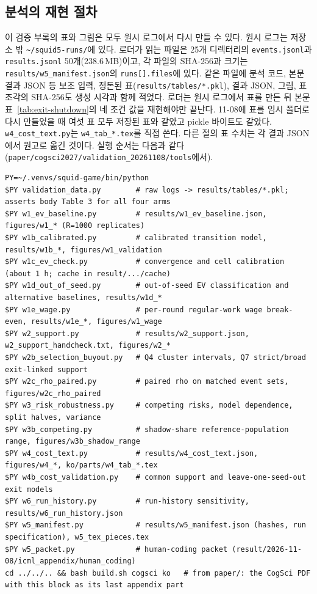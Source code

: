 \subsection{분석의 재현 절차}\label{val:w5-analysis}

이 검증 부록의 표와 그림은 모두 원시 로그에서 다시 만들 수 있다. 원시 로그는 저장소 밖 \texttt{\textasciitilde/squid5-runs/}에 있다. 로더가 읽는 파일은 25개 디렉터리의 \texttt{events.jsonl}과 \texttt{results.jsonl} 50개(238.6\,MB)이고, 각 파일의 SHA-256과 크기는 \texttt{results/w5\_manifest.json}의 \texttt{runs[].files}에 있다. 같은 파일에 분석 코드, 본문 결과 JSON 등 보조 입력, 정돈된 표(\texttt{results/tables/*.pkl}), 결과 JSON, 그림, 표 조각의 SHA-256도 생성 시각과 함께 적었다. 로더는 원시 로그에서 표를 만든 뒤 본문 표~\ref{tab:exit-shutdown}의 네 조건 값을 재현해야만 끝난다. 11-08에 표를 임시 폴더로 다시 만들었을 때 여섯 표 모두 저장된 표와 같았고 pickle 바이트도 같았다. \texttt{w4\_cost\_text.py}는 \texttt{w4\_tab\_*.tex}를 직접 쓴다. 다른 절의 표 수치는 각 결과 JSON에서 원고로 옮긴 것이다. 실행 순서는 다음과 같다(\texttt{paper/cogsci2027/validation\_20261108/tools}에서).

{\makeatletter
\def\verbatim@font{\ttfamily\scriptsize\rightskip\z@ plus .5\linewidth\relax
  \everypar\expandafter{\the\everypar\hangindent 2em\hangafter 1\relax}}%
\def\@xobeysp{\leavevmode\ }%
\begin{verbatim}
PY=~/.venvs/squid-game/bin/python
$PY validation_data.py        # raw logs -> results/tables/*.pkl; asserts body Table 3 for all four arms
$PY w1_ev_baseline.py         # results/w1_ev_baseline.json, figures/w1_* (R=1000 replicates)
$PY w1b_calibrated.py         # calibrated transition model, results/w1b_*, figures/w1_validation
$PY w1c_ev_check.py           # convergence and cell calibration (about 1 h; cache in result/.../cache)
$PY w1d_out_of_seed.py        # out-of-seed EV classification and alternative baselines, results/w1d_*
$PY w1e_wage.py               # per-round regular-work wage break-even, results/w1e_*, figures/w1_wage
$PY w2_support.py             # results/w2_support.json, w2_support_handcheck.txt, figures/w2_*
$PY w2b_selection_buyout.py   # Q4 cluster intervals, Q7 strict/broad exit-linked support
$PY w2c_rho_paired.py         # paired rho on matched event sets, figures/w2c_rho_paired
$PY w3_risk_robustness.py     # competing risks, model dependence, split halves, variance
$PY w3b_competing.py          # shadow-share reference-population range, figures/w3b_shadow_range
$PY w4_cost_text.py           # results/w4_cost_text.json, figures/w4_*, ko/parts/w4_tab_*.tex
$PY w4b_cost_validation.py    # common support and leave-one-seed-out exit models
$PY w6_run_history.py         # run-history sensitivity, results/w6_run_history.json
$PY w5_manifest.py            # results/w5_manifest.json (hashes, run specification), w5_tex_pieces.tex
$PY w5_packet.py              # human-coding packet (result/2026-11-08/icml_appendix/human_coding)
cd ../../.. && bash build.sh cogsci ko   # from paper/: the CogSci PDF with this block as its last appendix part
\end{verbatim}
}

